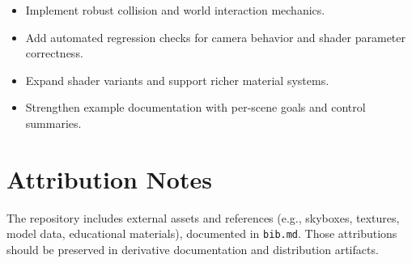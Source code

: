 \documentclass[11pt]{article}
\begin{document}
\begin{itemize}[leftmargin=*]
  \item Implement robust collision and world interaction mechanics.
  \item Add automated regression checks for camera behavior and shader parameter correctness.
  \item Expand shader variants and support richer material systems.
  \item Strengthen example documentation with per-scene goals and control summaries.
\end{itemize}

\section{Attribution Notes}

The repository includes external assets and references (e.g., skyboxes, textures, model data, educational materials), documented in \texttt{bib.md}. Those attributions should be preserved in derivative documentation and distribution artifacts.
\end{document}
